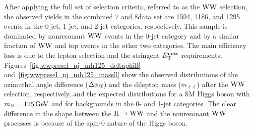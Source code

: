 \documentclass[12pt,twoside,a4paper,cmspaper,final,collab]{cms-tdr}
\begin{document}
After applying the full set of selection criteria,  referred to as the $\mathrm{W}\mathrm{W}$ selection,
the observed yields in the combined 7 and 8\TeV data set are 1594, 1186, and
1295 events in the 0-jet, 1-jet, and 2-jet categories, respectively. This sample is
dominated by nonresonant $\mathrm{W}\mathrm{W}$ events in the 0-jet category and by a
similar fraction of $\mathrm{W}\mathrm{W}$ and top events in the other two categories.
The main efficiency loss is due to the
lepton selection and the stringent $E_{\mathrm{T}}^{\text{miss}}$ requirements.
Figures~\ref{fig:wwpresel_nj_mh125_deltaphill} and~\ref{fig:wwpresel_nj_mh125_massll}
show the observed distributions of the azimuthal angle difference ($\Delta\phi_{\ell\ell}$) and
the dilepton mass ($m_{\ell\ell}$) after the $\mathrm{W}\mathrm{W}$ selection,
respectively, and the expected distributions for a SM Higgs boson with $m_{\mathrm{H}}=125\,\text{Ge\hspace{-.08em}V}$
and for backgrounds in the 0- and 1-jet categories. The clear difference in
the shape between the $\mathrm{H} \to \mathrm{W}\mathrm{W}$ and the nonresonant $\mathrm{W}\mathrm{W}$
processes is because of the spin-0 nature of the Higgs boson.
\end{document}
